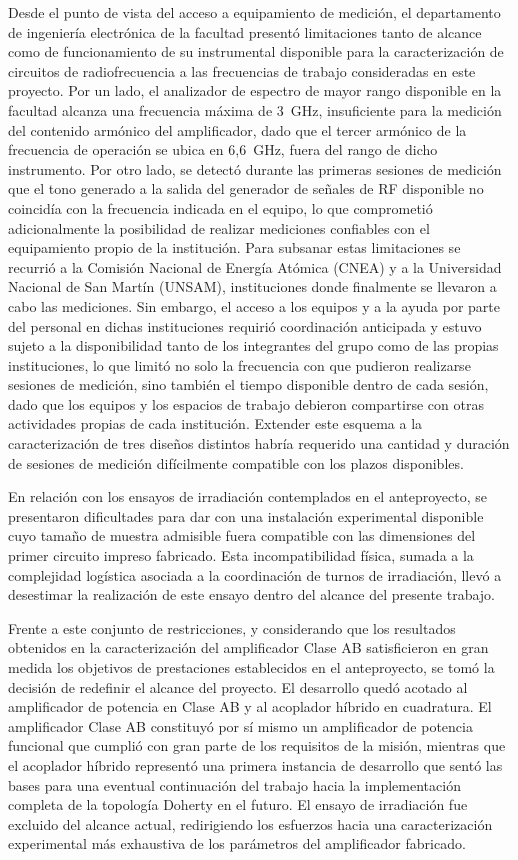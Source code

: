 Desde el punto de vista del acceso a equipamiento de medición, el departamento de ingeniería electrónica de la facultad presentó limitaciones tanto de alcance como de funcionamiento de su instrumental disponible para la caracterización de circuitos de radiofrecuencia a las frecuencias de trabajo consideradas en este proyecto. Por un lado, el analizador de espectro de mayor rango disponible en la facultad alcanza una frecuencia máxima de 3~GHz, insuficiente para la medición del contenido armónico del amplificador, dado que el tercer armónico de la frecuencia de operación se ubica en 6,6~GHz, fuera del rango de dicho instrumento. Por otro lado, se detectó durante las primeras sesiones de medición que el tono generado a la salida del generador de señales de RF disponible no coincidía con la frecuencia indicada en el equipo, lo que comprometió adicionalmente la posibilidad de realizar mediciones confiables con el equipamiento propio de la institución. Para subsanar estas limitaciones se recurrió a la Comisión Nacional de Energía Atómica (CNEA) y a la Universidad Nacional de San Martín (UNSAM), instituciones donde finalmente se llevaron a cabo las mediciones. Sin embargo, el acceso a los equipos y a la ayuda por parte del personal en dichas instituciones requirió coordinación anticipada y estuvo sujeto a la disponibilidad tanto de los integrantes del grupo como de las propias instituciones, lo que limitó no solo la frecuencia con que pudieron realizarse sesiones de medición, sino también el tiempo disponible dentro de cada sesión, dado que los equipos y los espacios de trabajo debieron compartirse con otras actividades propias de cada institución. Extender este esquema a la caracterización de tres diseños distintos habría requerido una cantidad y duración de sesiones de medición difícilmente compatible con los plazos disponibles.

En relación con los ensayos de irradiación contemplados en el anteproyecto, se presentaron dificultades para dar con una instalación experimental disponible cuyo tamaño de muestra admisible fuera compatible con las dimensiones del primer circuito impreso fabricado. Esta incompatibilidad física, sumada a la complejidad logística asociada a la coordinación de turnos de irradiación, llevó a desestimar la realización de este ensayo dentro del alcance del presente trabajo.

Frente a este conjunto de restricciones, y considerando que los resultados obtenidos en la caracterización del amplificador Clase AB satisficieron en gran medida los objetivos de prestaciones establecidos en el anteproyecto, se tomó la decisión de redefinir el alcance del proyecto. El desarrollo quedó acotado al amplificador de potencia en Clase AB y al acoplador híbrido en cuadratura. El amplificador Clase AB constituyó por sí mismo un amplificador de potencia funcional que cumplió con gran parte de los requisitos de la misión, mientras que el acoplador híbrido representó una primera instancia de desarrollo que sentó las bases para una eventual continuación del trabajo hacia la implementación completa de la topología Doherty en el futuro. El ensayo de irradiación fue excluido del alcance actual, redirigiendo los esfuerzos hacia una caracterización experimental más exhaustiva de los parámetros del amplificador fabricado.